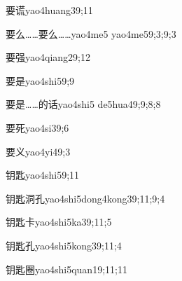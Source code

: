 \begin{verbete}{要谎}{yao4huang3}{9;11}
\end{verbete}

\begin{verbete}{要么……要么……}{yao4me5 yao4me5}{9;3;9;3}
\end{verbete}

\begin{verbete}{要强}{yao4qiang2}{9;12}
\end{verbete}

\begin{verbete}{要是}{yao4shi5}{9;9}
\end{verbete}

\begin{verbete}{要是……的话}{yao4shi5 de5hua4}{9;9;8;8}
\end{verbete}

\begin{verbete}{要死}{yao4si3}{9;6}
\end{verbete}

\begin{verbete}{要义}{yao4yi4}{9;3}
\end{verbete}

\begin{verbete}{钥匙}{yao4shi5}{9;11}
\end{verbete}

\begin{verbete}{钥匙洞孔}{yao4shi5dong4kong3}{9;11;9;4}
\end{verbete}

\begin{verbete}{钥匙卡}{yao4shi5ka3}{9;11;5}
\end{verbete}

\begin{verbete}{钥匙孔}{yao4shi5kong3}{9;11;4}
\end{verbete}

\begin{verbete}{钥匙圈}{yao4shi5quan1}{9;11;11}
\end{verbete}

